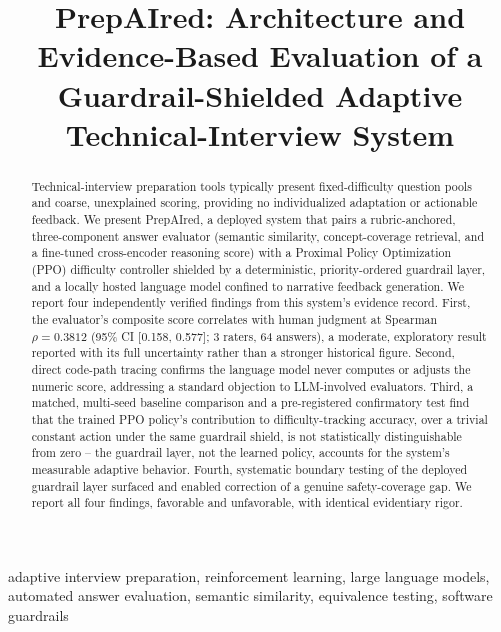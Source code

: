 \documentclass[conference]{IEEEtran}
\begin{document}
\title{PrepAIred: Architecture and Evidence-Based Evaluation of a Guardrail-Shielded Adaptive Technical-Interview System}

\author{
}

\maketitle

\begin{abstract}
Technical-interview preparation tools typically present fixed-difficulty question pools and coarse, unexplained scoring, providing no individualized adaptation or actionable feedback. We present PrepAIred, a deployed system that pairs a rubric-anchored, three-component answer evaluator (semantic similarity, concept-coverage retrieval, and a fine-tuned cross-encoder reasoning score) with a Proximal Policy Optimization (PPO) difficulty controller shielded by a deterministic, priority-ordered guardrail layer, and a locally hosted language model confined to narrative feedback generation. We report four independently verified findings from this system's evidence record. First, the evaluator's composite score correlates with human judgment at Spearman $\rho = 0.3812$ (95\% CI [0.158, 0.577]; 3 raters, 64 answers), a moderate, exploratory result reported with its full uncertainty rather than a stronger historical figure. Second, direct code-path tracing confirms the language model never computes or adjusts the numeric score, addressing a standard objection to LLM-involved evaluators. Third, a matched, multi-seed baseline comparison and a pre-registered confirmatory test find that the trained PPO policy's contribution to difficulty-tracking accuracy, over a trivial constant action under the same guardrail shield, is not statistically distinguishable from zero -- the guardrail layer, not the learned policy, accounts for the system's measurable adaptive behavior. Fourth, systematic boundary testing of the deployed guardrail layer surfaced and enabled correction of a genuine safety-coverage gap. We report all four findings, favorable and unfavorable, with identical evidentiary rigor.
\end{abstract}

\begin{IEEEkeywords}
adaptive interview preparation, reinforcement learning, large language models, automated answer evaluation, semantic similarity, equivalence testing, software guardrails
\end{IEEEkeywords}
\end{document}
